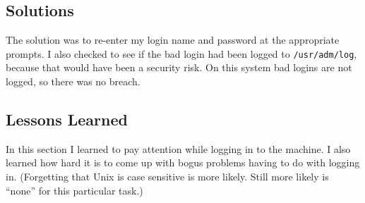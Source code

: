\documentclass[11pt]{article}
\begin{document}
\subsection{Solutions}

  The solution was to re-enter my login name and password at the
  appropriate prompts.  I also checked to see if the bad login
  had been logged to {\tt /usr/adm/log}, because that would have
  been a security risk.  On this system bad logins are not logged,
  so there was no breach.

\subsection{Lessons Learned}

  In this section I learned to pay attention while logging in to
the machine.  I also learned how hard it is to come up with bogus
problems having to do with logging in.  (Forgetting that {\sc Unix} is
case sensitive is more likely.  Still more likely is ``none'' for
this particular task.)
\end{document}
